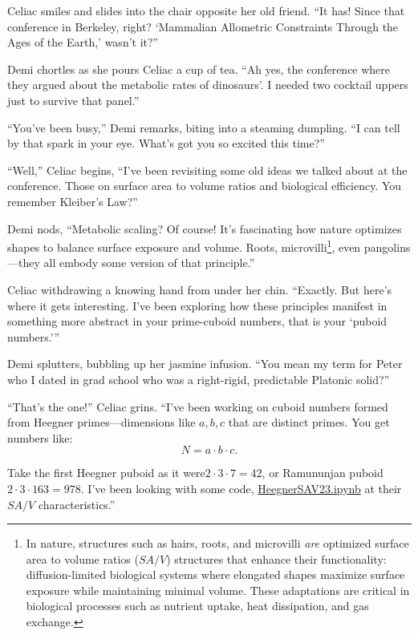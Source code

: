 Celiac smiles and slides into the chair opposite her old friend. “It has! Since that conference in Berkeley, right? ‘Mammalian Allometric Constraints Through the Ages of the Earth,’ wasn’t it?”

Demi chortles as she pours Celiac a cup of tea. “Ah yes, the conference where they argued about the metabolic rates of dinosaurs'. I needed two cocktail uppers just to survive that panel.”

“You’ve been busy,” Demi remarks, biting into a steaming dumpling. “I can tell by that spark in your eye. What’s got you so excited this time?”

“Well,” Celiac begins, “I’ve been revisiting some old ideas we talked about at the conference. Those on surface area to volume ratios and biological efficiency. You remember Kleiber’s Law?”

Demi nods, “Metabolic scaling? Of course! It's fascinating how nature optimizes shapes to balance surface exposure and volume. Roots, microvilli\footnote{In nature, structures such as hairs, roots, and microvilli \emph{are} optimized surface area to volume ratios (\(SA/V\)) structures that enhance their functionality: diffusion-limited biological systems where elongated shapes maximize surface exposure while maintaining minimal volume. These adaptations are critical in biological processes such as nutrient uptake, heat dissipation, and gas exchange.}, even pangolins—they all embody some version of that principle.”

Celiac withdrawing a knowing hand from under her chin. “Exactly. But here’s where it gets interesting. I’ve been exploring how these principles manifest in something more abstract in your prime-cuboid numbers, that is your ‘puboid numbers.’”

Demi splutters, bubbling up her jasmine infusion. “You mean my term for Peter who I dated in grad school who was a right-rigid, predictable Platonic solid?”

“That’s the one!” Celiac grins. “I’ve been working on cuboid numbers formed from Heegner primes—dimensions like \(a, b, c\) that are distinct primes. You get numbers like:
\[
N = a \cdot b \cdot c.
\]

Take the first Heegner puboid as it were\( 2 \cdot 3 \cdot 7 = 42 \), or Ramununjan puboid \( 2 \cdot 3 \cdot 163 = 978 \). I’ve been looking with some code, \href{https://colab.research.google.com/drive/1XtOaEU94aMXxpmX2ejKOUoq3Cv0dkDkc?usp=sharing}{HeegnerSAV23.ipynb} at their \( SA/V \) characteristics.”

